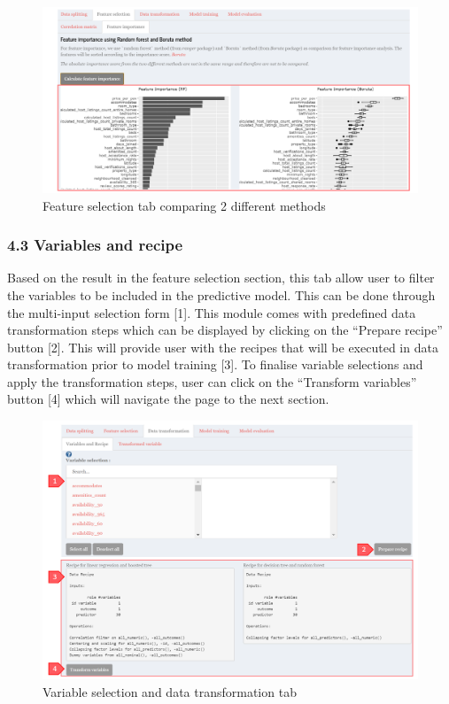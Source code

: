 \documentclass[
  12pt,
]{article}
\begin{document}
\begin{figure}[H]

{\centering \includegraphics[width=0.95\linewidth]{images/featureselect} 

}

\caption{Feature selection tab comparing 2 different methods}\label{fig:unnamed-chunk-21}
\end{figure}

\hypertarget{variables-and-recipe}{%
\subsubsection{4.3 Variables and recipe}\label{variables-and-recipe}}

Based on the result in the feature selection section, this tab allow
user to filter the variables to be included in the predictive model.
This can be done through the multi-input selection form {[}1{]}. This
module comes with predefined data transformation steps which can be
displayed by clicking on the ``Prepare recipe'' button {[}2{]}. This
will provide user with the recipes that will be executed in data
transformation prior to model training {[}3{]}. To finalise variable
selections and apply the transformation steps, user can click on the
``Transform variables'' button {[}4{]} which will navigate the page to
the next section.

\begin{figure}[H]

{\centering \includegraphics[width=0.95\linewidth]{images/datatrf1} 

}

\caption{Variable selection and data transformation tab}\label{fig:unnamed-chunk-22}
\end{figure}
\end{document}
